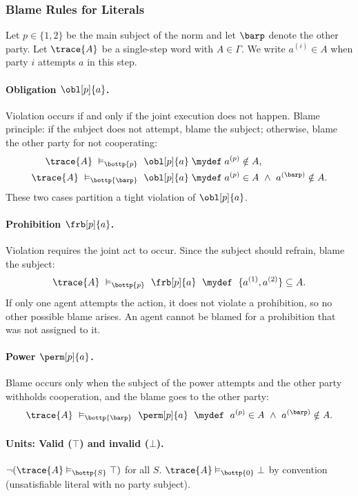 \subsubsection*{Blame Rules for Literals}
\begin{definition}
Let $p\in\{1,2\}$ be the main subject of the norm and let $\barp$ denote the other party.
Let $\trace{A}$ be a single-step word with $A\in\Gamma$. We write $a^{(i)}\in A$ when party $i$ attempts $a$ in this step.

\paragraph{Obligation \(\obl[p]{a}\).}
Violation occurs if and only if the joint execution does not happen. Blame principle:
if the subject does not attempt, blame the subject; otherwise, blame the other party for not cooperating:
\[
\begin{aligned}
\trace{A}\ \vDash_{\bottp{p}}\ \obl[p]{a} \;&\mydef\; a^{(p)}\notin A,\\
\trace{A}\ \vDash_{\bottp{\barp}}\ \obl[p]{a} \;&\mydef\; a^{(p)}\in A\ \land\ a^{(\barp)}\notin A.
\end{aligned}
\]
These two cases partition a tight violation of $\obl[p]{a}$.

\paragraph{Prohibition \(\frb[p]{a}\).}
Violation requires the joint act to occur. Since the subject should refrain, blame the subject:
\[
\trace{A}\ \vDash_{\bottp{p}}\ \frb[p]{a}\ \;\mydef\;\ \{a^{(1)}, a^{(2)}\}\subseteq A.
\]
If only one agent attempts the action, it does not violate a prohibition, so no other possible blame arises. An agent cannot be blamed for a prohibition that was not assigned to it.

\paragraph{Power \(\perm[p]{a}\).}
Blame occurs only when the subject of the power attempts and the other party withholds cooperation, and the blame goes to the other party:
\[
\trace{A}\ \vDash_{\bottp{\barp}}\ \perm[p]{a}\ \;\mydef\;\ a^{(p)}\in A\ \land\ a^{(\barp)}\notin A.
\]

\paragraph{Units: Valid ($\top$) and invalid ($\bot$).}
\(\lnot(\trace{A}\vDash_{\bottp{S}}\top)\) for all $S$.  
\(\trace{A}\vDash_{\bottp{0}}\bot\) by convention (unsatisfiable literal with no party subject).


\end{definition}
